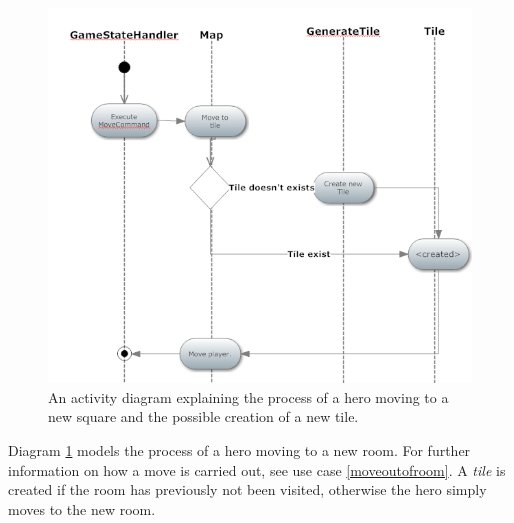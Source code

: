 \begin{figure}[h]
\center
\includegraphics{diagrams/moveActivityDiagram.png}
\caption{An activity diagram explaining the process of a hero moving to a new square and the possible creation of a new tile.}
\label{fig:move_activity_diagram}
\end{figure}

Diagram \ref{fig:move_activity_diagram} models the process of a hero moving to a new room. For further information on how a move is carried out, see use case \ref{moveoutofroom}. A \emph{tile} is created if the room has previously not been visited, otherwise the hero simply moves to the new room.



